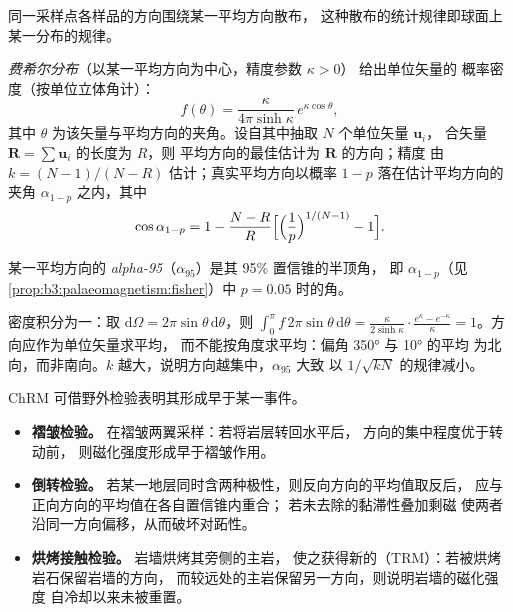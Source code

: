 同一采样点各样品的方向围绕某一平均方向散布，
这种散布的统计规律即球面上某一分布的规律。

\begin{proposition}[费希尔分布]\label{prop:b3:palaeomagnetism:fisher}
\emph{费希尔分布}（以某一平均方向为中心，精度参数 $\kappa > 0$）
给出单位矢量的
概率密度（按单位立体角计）：
\[
  f(\theta) = \frac{\kappa}{4\pi\sinh\kappa}\,e^{\kappa\cos\theta},
\]
其中 $\theta$ 为该矢量与平均方向的夹角。设自其中抽取 $N$ 个单位矢量 $\mathbf u_i$，
合矢量 $\mathbf R = \sum\mathbf u_i$ 的长度为 $R$，则
平均方向的最佳估计为 $\mathbf R$ 的方向；精度
由 $k = (N - 1)/(N - R)$ 估计；真实平均方向以概率
$1 - p$ 落在估计平均方向的夹角 $\alpha_{1-p}$ 之内，其中
\[
  \cos\alpha_{1-p} = 1 - \frac{N - R}{R}\Bigl[\Bigl(\frac1p\Bigr)^{1/(N-1)} - 1\Bigr].
\]
\end{proposition}
\admitted

\begin{definition}[alpha-95]\label{def:b3:palaeomagnetism:a95}
某一平均方向的 \emph{alpha-95}（$\alpha_{95}$）是其
95\% 置信锥的半顶角，
即 $\alpha_{1-p}$（见\cref{prop:b3:palaeomagnetism:fisher}）中 $p = 0.05$ 时的角。
\end{definition}

密度积分为一：取 $\mathrm d\Omega = 2\pi\sin\theta\,\mathrm
d\theta$，则 $\int_0^\pi f\,2\pi\sin\theta\,\mathrm d\theta =
\frac{\kappa}{2\sinh\kappa}\cdot\frac{e^\kappa - e^{-\kappa}}{\kappa} = 1$。方向应作为单位矢量求平均，
而不能按角度求平均：偏角 \ang{350} 与 \ang{10} 的平均
为北向，而非南向。$k$ 越大，说明方向越集中，$\alpha_{95}$ 大致
以 $1/\sqrt{kN}$ 的规律减小。

\begin{method}[古地磁方向的野外检验]\label{met:b3:palaeomagnetism:tests}
ChRM 可借野外检验表明其形成早于某一事件。
\begin{itemize}
  \item \textbf{褶皱检验。} 在褶皱两翼采样：若将岩层转回水平后，
        方向的集中程度优于转动前，
        则磁化强度形成早于褶皱作用。
  \item \textbf{倒转检验。} 若某一地层同时含两种极性，则反向方向的平均值取反后，
        应与正向方向的平均值在各自置信锥内重合；
        若未去除的黏滞性叠加剩磁
        使两者沿同一方向偏移，从而破坏对跖性。
  \item \textbf{烘烤接触检验。} 岩墙烘烤其旁侧的主岩，
        使之获得新的（TRM）：若被烘烤岩石保留岩墙的方向，
        而较远处的主岩保留另一方向，则说明岩墙的磁化强度
        自冷却以来未被重置。
\end{itemize}
\end{method}

